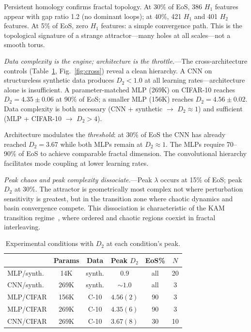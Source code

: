 \documentclass[aps,prl,twocolumn,superscriptaddress,floatfix]{revtex4-2}
\begin{document}
Persistent homology confirms fractal topology. At 30\% of EoS, 386 $H_1$ features appear with gap ratio 1.2 (no dominant loops); at 40\%, 421 $H_1$ and 401 $H_2$ features. At 5\% of EoS, zero $H_1$ features: a simple convergence path. This is the topological signature of a strange attractor---many holes at all scales---not a smooth torus.

\textit{Data complexity is the engine; architecture is the throttle.}---The cross-architecture controls (Table~\ref{tab:conditions}, Fig.~\ref{fig:cross}) reveal a clean hierarchy. A CNN on structureless synthetic data produces $D_2 < 1.0$ at all learning rates---architecture alone is insufficient. A parameter-matched MLP (269K) on CIFAR-10 reaches $D_2 = 4.35 \pm 0.06$ at 90\% of EoS; a smaller MLP (156K) reaches $D_2 = 4.56 \pm 0.02$. Data complexity is both necessary (CNN + synthetic $\to$ $D_2 \approx 1$) and sufficient (MLP + CIFAR-10 $\to$ $D_2 > 4$).

Architecture modulates the \textit{threshold}: at 30\% of EoS the CNN has already reached $D_2 = 3.67$ while both MLPs remain at $D_2 \approx 1$. The MLPs require 70--90\% of EoS to achieve comparable fractal dimension. The convolutional hierarchy facilitates mode coupling at lower learning rates.

\textit{Peak chaos and peak complexity dissociate.}---Peak $\lambda$ occurs at 15\% of EoS; peak $D_2$ at 30\%. The attractor is geometrically most complex not where perturbation sensitivity is greatest, but in the transition zone where chaotic dynamics and basin convergence compete. This dissociation is characteristic of the KAM transition regime~\cite{kam}, where ordered and chaotic regions coexist in fractal interleaving.

\begin{table}[b]
\caption{\label{tab:conditions}%
Experimental conditions with $D_2$ at each condition's peak.}
\begin{ruledtabular}
\begin{tabular}{lccccc}
 & Params & Data & Peak $D_2$ & EoS\% & $N$\\
\hline
MLP/synth. & 14K & synth. & 0.9 & all & 20\\
CNN/synth. & 269K & synth. & ${\sim}1.0$ & all & 3\\
MLP/CIFAR & 156K & C-10 & $4.56(2)$ & 90 & 3\\
MLP/CIFAR & 269K & C-10 & $4.35(6)$ & 90 & 3\\
CNN/CIFAR & 269K & C-10 & $3.67(8)$ & 30 & 10\\
\end{tabular}
\end{ruledtabular}
\end{table}
\end{document}
